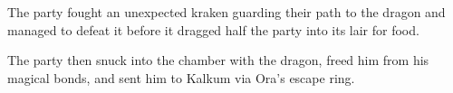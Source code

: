 The party fought an unexpected kraken guarding their path to the dragon and managed to defeat it before it dragged half the party into its lair for food.

The party then snuck into the chamber with the dragon, freed him from his magical bonds, and sent him to Kalkum via Ora's escape ring.

